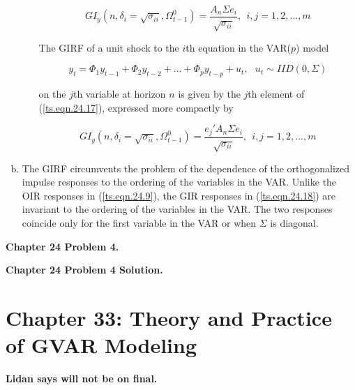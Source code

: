 \begin{enumerate}[(a)]
\begin{itemize}
\begin{equation}\label{ts.eqn.24.17}
GI_y(n, \delta_i  = \sqrt{\sigma_{ii}}, \Omega_{t-1}^0) = \frac{A_n \Sigma e_i}{\sqrt{\sigma_{ii}}}, \ \ i, j = 1, 2, \ldots, m
\end{equation}

The GIRF of a unit shock to the \(i\)th equation in the VAR(\(p\)) model 

\begin{equation}\label{ts.eqn.24.1}
y_t = \Phi_1 y_{t-1} + \Phi_2 y_{t-2} + \ldots + \Phi_p y_{t-p} + u_t, \ \ \ u_t \sim IID(0, \Sigma)
\end{equation}

on the \(j\)th variable at horizon \(n\) is given by the \(j\)th element of (\ref{ts.eqn.24.17}), expressed more compactly by

\begin{equation}\label{ts.eqn.24.18}
GI_y(n, \delta_i  = \sqrt{\sigma_{ii}}, \Omega_{t-1}^0) = \frac{e_j'A_n \Sigma e_i}{\sqrt{\sigma_{ii}}}, \ \ i, j = 1, 2, \ldots, m
\end{equation}

\end{itemize}

\item The GIRF circumvents the problem of the dependence of the orthogonalized impulse responses to the ordering of the variables in the VAR. Unlike the OIR responses in (\ref{ts.eqn.24.9}), the GIR responses in (\ref{ts.eqn.24.18}) are invariant to the ordering of the variables in the VAR. The two responses coincide only for the first variable in the VAR or when \(\Sigma\) is diagonal. 

\end{enumerate}



\textbf{Chapter 24 Problem 4.}



\textbf{Chapter 24 Problem 4 Solution.}

%
%
%
%
%
%

\section{Chapter 33: Theory and Practice of GVAR Modeling}

\textbf{Lidan says will not be on final.}



%
%
%
%
%
%
%
%
%